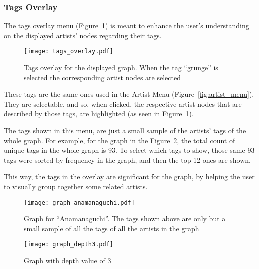 
    \subsubsection{Tags Overlay} %
      \label{ssub:tags_overlay}

      The tags overlay menu (Figure~\ref{fig:tags_overlay}) is meant to enhance the user's understanding on the displayed artists' nodes regarding their tags.
      \begin{figure}[tb]
        \begin{center}
          \texttt{[image: tags\_overlay.pdf]}
        \end{center}
        \caption{Tags overlay for the displayed graph. When the tag ``grunge'' is selected the corresponding artist nodes are selected}
        \label{fig:tags_overlay}
      \end{figure}
      These tags are the same ones used in the Artist Menu (Figure~\ref{fig:artist_menu}).
      They are selectable, and so, when clicked, the respective artist nodes that are described by those tags, are highlighted (as seen in Figure~\ref{fig:tags_overlay}).

      The tags shown in this menu, are just a small sample of the artists' tags of the whole graph.
      For example, for the graph in the Figure~\ref{fig:graph_anamanaguchi}, the total count of unique tags in the whole graph is 93.
      To select which tags to show, those same 93 tags were sorted by frequency in the graph, and then the top 12 ones are shown.

      This way, the tags in the overlay are significant for the graph, by helping the user to visually group together some related artists.

      \begin{figure}
        \begin{center}
          \texttt{[image: graph\_anamanaguchi.pdf]}
        \end{center}
        \caption{Graph for ``Anamanaguchi''. The tags shown above are only but a small sample of all the tags of all the artists in the graph}
        \label{fig:graph_anamanaguchi}
      \end{figure}

      \begin{figure}[hb]
        \begin{center}
          \texttt{[image: graph\_depth3.pdf]}
        \end{center}
        \caption{Graph with depth value of 3}
        \label{fig:graph_depth3}
      \end{figure}

